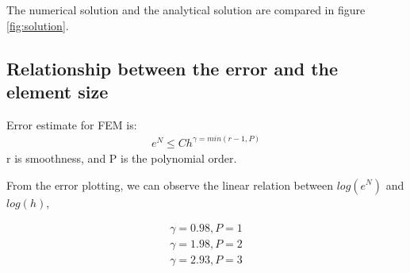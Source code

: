 \documentclass[paper=a4, fontsize=11pt]{article} %
\begin{document}
The numerical solution and the analytical solution are compared in figure \ref{fig:solution}. 


        
        


\subsection{Relationship between the error and the element size}
Error estimate for FEM is:
\begin{eqnarray}
e^N \leq Ch^{\gamma = min (r-1, P)}
\end{eqnarray}
r is smoothness, and P is the polynomial order.

From the error plotting, we can observe the linear relation between $log(e^N)$ and $log(h)$, 

\begin{eqnarray}
\gamma = 0.98, P=1\nonumber\\
\gamma = 1.98, P=2\nonumber\\
\gamma = 2.93, P=3\nonumber\\
\end{eqnarray}
\end{document}
